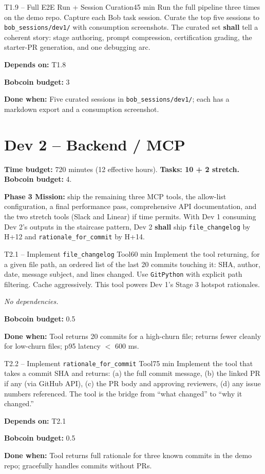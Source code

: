 \documentclass[11pt,letterpaper]{article}
\newcommand{\acceptance}[1]{\par\smallskip\textcolor{ibmgreen}{\textbf{Done when:}} #1}
\newcommand{\depends}[1]{\par\smallskip\textcolor{ibmorange}{\textbf{Depends on:}} #1}
\newcommand{\nodep}{\par\smallskip\textcolor{ibmgray}{\textit{No dependencies.}}}
\newcommand{\bobcost}[1]{\par\smallskip\textcolor{ibmaccent}{\textbf{Bobcoin budget:}} #1}
\newcommand{\shall}{\textbf{shall}}
\begin{document}
\begin{task}{T1.9 -- Full E2E Run + Session Curation}{45 min}
Run the full pipeline three times on the demo repo. Capture each Bob task session. Curate the top five sessions to \texttt{bob\_sessions/dev1/} with consumption screenshots. The curated set \shall{} tell a coherent story: stage authoring, prompt compression, certification grading, the starter-PR generation, and one debugging arc.
\depends{T1.8}
\bobcost{3}
\acceptance{Five curated sessions in \texttt{bob\_sessions/dev1/}; each has a markdown export and a consumption screenshot.}
\end{task}

\section{Dev 2 -- Backend / MCP}

\textbf{Time budget:} 720 minutes (12 effective hours). \textbf{Tasks: 10 + 2 stretch.} \textbf{Bobcoin budget:} 4.

\textbf{Phase 3 Mission:} ship the remaining three MCP tools, the allow-list configuration, a final performance pass, comprehensive API documentation, and the two stretch tools (Slack and Linear) if time permits. With Dev 1 consuming Dev 2's outputs in the staircase pattern, Dev 2 \shall{} ship \texttt{file\_changelog} by H+12 and \texttt{rationale\_for\_commit} by H+14.

\begin{task}{T2.1 -- Implement \texttt{file\_changelog} Tool}{60 min}
Implement the tool returning, for a given file path, an ordered list of the last 20 commits touching it: SHA, author, date, message subject, and lines changed. Use \texttt{GitPython} with explicit path filtering. Cache aggressively. This tool powers Dev 1's Stage 3 hotspot rationales.
\nodep
\bobcost{0.5}
\acceptance{Tool returns 20 commits for a high-churn file; returns fewer cleanly for low-churn files; p95 latency $<$ 600 ms.}
\end{task}

\begin{task}{T2.2 -- Implement \texttt{rationale\_for\_commit} Tool}{75 min}
Implement the tool that takes a commit SHA and returns: (a) the full commit message, (b) the linked PR if any (via GitHub API), (c) the PR body and approving reviewers, (d) any issue numbers referenced. The tool is the bridge from ``what changed'' to ``why it changed.''
\depends{T2.1}
\bobcost{0.5}
\acceptance{Tool returns full rationale for three known commits in the demo repo; gracefully handles commits without PRs.}
\end{task}
\end{document}
